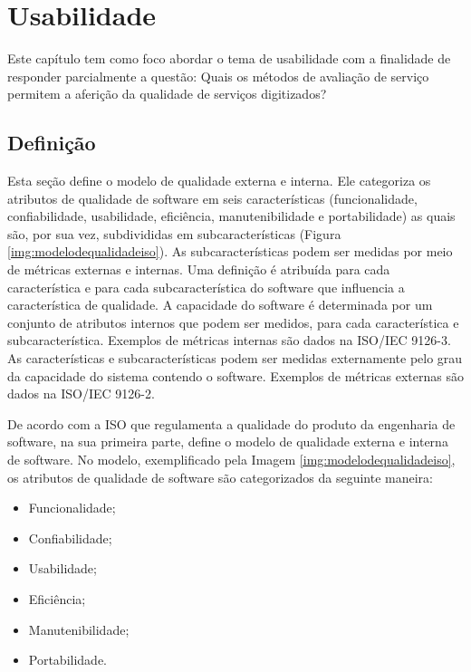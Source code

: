 \chapter[Usabilidade]{Usabilidade}
Este capítulo tem como foco abordar o tema de usabilidade com a finalidade de responder parcialmente a questão: Quais os métodos de avaliação de serviço permitem a aferição da qualidade de serviços digitizados? 

\section{Definição}

Esta seção define o modelo de qualidade externa e interna. Ele categoriza os atributos de qualidade de software em seis
características (funcionalidade, confiabilidade, usabilidade, eficiência, manutenibilidade e portabilidade) as quais são, por
sua vez, subdivididas em subcaracterísticas (Figura \ref{img:modelodequalidadeiso}). As subcaracterísticas podem ser medidas por meio de métricas
externas e internas.
Uma definição é atribuída para cada característica e para cada subcaracterística do software que influencia a característica
de qualidade. A capacidade do software é determinada por um conjunto de atributos internos que podem ser medidos,
para cada característica e subcaracterística. Exemplos de métricas internas são dados na ISO/IEC 9126-3.
As características e subcaracterísticas podem ser medidas externamente pelo grau da capacidade do sistema contendo o
software. Exemplos de métricas externas são dados na ISO/IEC 9126-2.


De acordo com a ISO\cite{iso9126} que regulamenta a qualidade do produto da engenharia de software, na sua primeira parte, define o modelo de qualidade externa e interna de software. No modelo, exemplificado pela Imagem \ref{img:modelodequalidadeiso}, os atributos de qualidade de software são categorizados da seguinte maneira:

\begin{itemize}
	\item{Funcionalidade;}
	\item{Confiabilidade;}
	\item{Usabilidade;}
	\item{Eficiência;}
	\item{Manutenibilidade;}
	\item{Portabilidade.}
\end{itemize}

